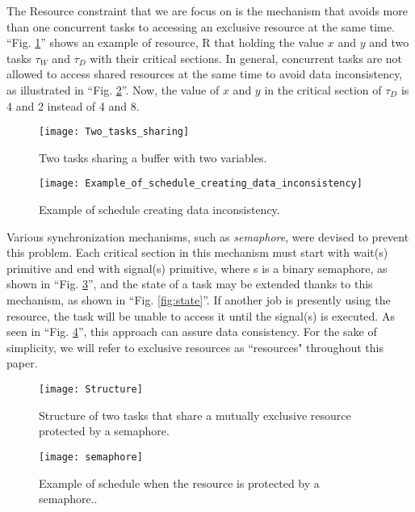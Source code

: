 The Resource constraint that we are focus on is the mechanism that avoids more than one concurrent tasks to accessing an exclusive resource at the same time. ``Fig. \ref{fig:Two_tasks_sharing}'' shows an example of resource, R that holding the value $x$ and $y$ and two tasks $\tau_{W}$ and $\tau_{D}$ with their critical sections. In general, concurrent tasks are not allowed to access shared resources at the same time to avoid data inconsistency, as illustrated in ``Fig. \ref{fig:Example_of_schedule_creating_data_inconsistency}''. Now, the value of $x$ and $y$ in the critical section of $\tau_{D}$ is 4 and 2 instead of 4 and 8.

\begin{figure}[ht]
    \centering
    \texttt{[image: Two\_tasks\_sharing]}
    \caption{ Two tasks sharing a buffer with two variables. \cite{b5}}
    \label{fig:Two_tasks_sharing}
\end{figure}

\begin{figure}[ht]
    \centering
    \texttt{[image: Example\_of\_schedule\_creating\_data\_inconsistency]}
    \caption{Example of schedule creating data inconsistency. \cite{b5}}
    \label{fig:Example_of_schedule_creating_data_inconsistency}
\end{figure}

Various synchronization mechanisms, such as \textit{semaphore}, were devised to prevent this problem. Each critical section in this mechanism must start with wait(s) primitive and end with signal(s) primitive, where s is a binary semaphore, as shown in ``Fig. \ref{fig:Structure}'', and the state of a task may be extended thanks to this mechanism, as shown in ``Fig. \ref{fig:state}''. If another job is presently using the resource, the task will be unable to access it until the signal(s) is executed. As seen in ``Fig. \ref{fig:semaphore}'', this approach can assure data consistency. For the sake of simplicity, we will refer to exclusive resources as ``resources" throughout this paper.

\begin{figure}[ht]
    \centering
    \texttt{[image: Structure]}
    \caption{Structure of two tasks that share a mutually exclusive resource protected by
a semaphore. \cite{b5}}
    \label{fig:Structure}
\end{figure}


\begin{figure}[ht]
    \centering
    \texttt{[image: semaphore]}
    \caption{Example of schedule when the resource is protected by a semaphore.. \cite{b5}}
    \label{fig:semaphore}
\end{figure}

